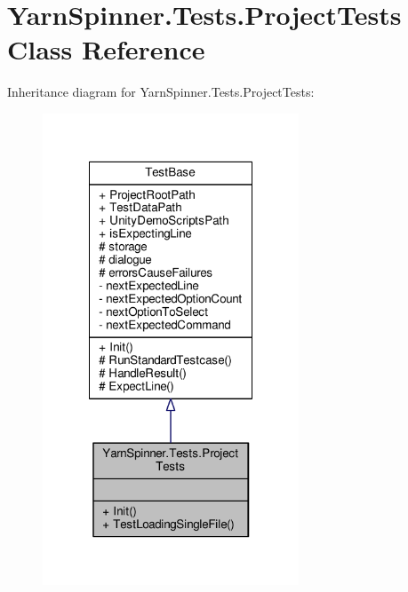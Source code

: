 \hypertarget{a00139}{\section{Yarn\-Spinner.\-Tests.\-Project\-Tests Class Reference}
\label{a00139}
}


Inheritance diagram for Yarn\-Spinner.\-Tests.\-Project\-Tests\-:
\nopagebreak
\begin{figure}[H]
\begin{center}
\leavevmode
\includegraphics[width=216pt]{a00728}
\end{center}
\end{figure}


